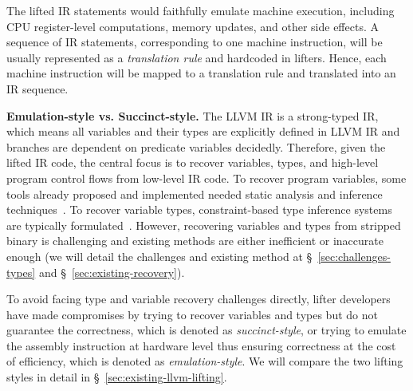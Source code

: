 
The lifted IR statements would faithfully emulate machine execution, including
CPU register-level computations, memory updates, and other side effects. A
sequence of IR statements, corresponding to one machine instruction, will be
usually represented as a \textit{translation rule} and hardcoded in lifters.
Hence, each machine instruction will be mapped to a translation rule and
translated into an IR sequence.

\noindent \textbf{Emulation-style vs. Succinct-style.} The LLVM IR is a
strong-typed IR, which means all variables and their types are explicitly
defined in LLVM IR and branches are dependent on predicate variables
decidedly. Therefore, given the lifted IR code, the central focus is to
recover variables, types, and high-level program control flows from low-level
IR code. To recover program variables, some tools already proposed and
implemented needed static analysis and inference
techniques~\cite{anand2013compiler,balakrishnan2010wysinwyx,balakrishnan2007divine,reps2008improved,elwazeer2013scalable}.
To recover variable types, constraint-based type inference systems are
typically formulated~\cite{lee2011tie,noonan2016polymorphic}. However,
recovering variables and types from stripped binary is challenging and
existing methods are either inefficient or inaccurate enough (we will detail
the challenges and existing method at \S~\ref{sec:challenges-types} and \S~\ref{sec:existing-recovery}).

To avoid facing type and variable recovery challenges directly, lifter
developers have made compromises by trying to recover variables and types but
do not guarantee the correctness, which is denoted as \textit{succinct-style},
or trying to emulate the assembly instruction at hardware level thus ensuring
correctness at the cost of efficiency, which is denoted as \textit{emulation-style}.
We will compare the two lifting styles in detail in \S~\ref{sec:existing-llvm-lifting}.

